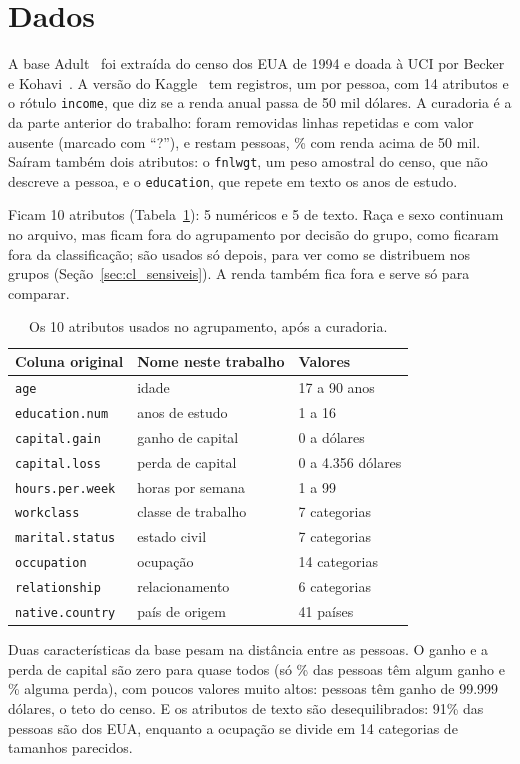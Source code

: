 \section{Dados}\label{sec:km_dados}

A base Adult~\cite{uci:adult} foi extraída do censo dos EUA de 1994 e doada à UCI por Becker e Kohavi~\cite{kohavi:96}. A versão do Kaggle~\cite{kaggle:adult} tem \svLinhasBrutas{} registros, um por pessoa, com 14 atributos e o rótulo \texttt{income}, que diz se a renda anual passa de 50 mil dólares. A curadoria é a da parte anterior do trabalho: foram removidas \svDuplicadas{} linhas repetidas e \svAusentes{} com valor ausente (marcado com ``?''), e restam \svLinhas{} pessoas, \svPositivos\% com renda acima de 50 mil. Saíram também dois atributos: o \texttt{fnlwgt}, um peso amostral do censo, que não descreve a pessoa, e o \texttt{education}, que repete em texto os anos de estudo.

Ficam 10 atributos (Tabela~\ref{tab:km_atributos}): 5 numéricos e 5 de texto. Raça e sexo continuam no arquivo, mas ficam fora do agrupamento por decisão do grupo, como ficaram fora da classificação; são usados só depois, para ver como se distribuem nos grupos (Seção~\ref{sec:cl_sensiveis}). A renda também fica fora e serve só para comparar.

\begin{table}[ht]
\centering
\caption{Os 10 atributos usados no agrupamento, após a curadoria.}
\label{tab:km_atributos}
\footnotesize
\begin{tabular}{lll}
\toprule
Coluna original & Nome neste trabalho & Valores \\
\midrule
\texttt{age} & idade & 17 a 90 anos \\
\texttt{education.num} & anos de estudo & 1 a 16 \\
\texttt{capital.gain} & ganho de capital & 0 a \svGanhoMax{} dólares \\
\texttt{capital.loss} & perda de capital & 0 a 4.356 dólares \\
\texttt{hours.per.week} & horas por semana & 1 a 99 \\
\texttt{workclass} & classe de trabalho & 7 categorias \\
\texttt{marital.status} & estado civil & 7 categorias \\
\texttt{occupation} & ocupação & 14 categorias \\
\texttt{relationship} & relacionamento & 6 categorias \\
\texttt{native.country} & país de origem & 41 países \\
\bottomrule
\end{tabular}
\end{table}

Duas características da base pesam na distância entre as pessoas. O ganho e a perda de capital são zero para quase todos (só \clComGanho\% das pessoas têm algum ganho e \clComPerda\% alguma perda), com poucos valores muito altos: \clTeto{} pessoas têm ganho de 99.999 dólares, o teto do censo. E os atributos de texto são desequilibrados: 91\% das pessoas são dos EUA, enquanto a ocupação se divide em 14 categorias de tamanhos parecidos.
